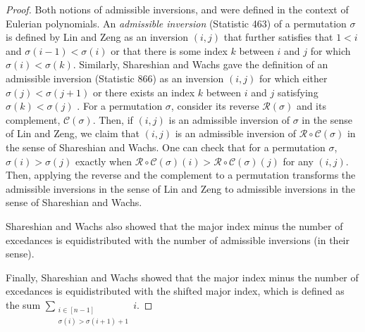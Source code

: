 \documentclass{amsart}
\theoremstyle{definition}
\newcommand{\C}{\mathcal{C}} %
\newcommand{\R}{\mathcal{R}} %
\begin{document}
\begin{proof}
  Both notions of admissible inversions, and were defined in the context of Eulerian polynomials. An \textit{admissible inversion} (Statistic 463) of a permutation $\sigma$ is defined by Lin and Zeng  \cite{LinZeng}  as an inversion $(i,j)$ that further satisfies that $1<i$ and $\sigma(i-1)<\sigma(i)$ or that there is some index $k$ between $i$ and $j$ for which $\sigma(i)<\sigma(k)$. Similarly, Shareshian and Wachs gave the definition of an admissible inversion (Statistic 866) as an inversion $(i,j)$ for which either $\sigma(j)<\sigma(j+1)$ or there exists an index $k$ between $i$ and $j$ satisfying $\sigma(k)<\sigma(j)$ \cite{ShareshianWachs2007}. For a permutation $\sigma$, consider its reverse $\R(\sigma)$ and its complement, $\C(\sigma)$. Then, if $(i,j)$ is an admissible inversion of $\sigma$ in the sense of Lin and Zeng, we claim that $(i,j)$ is an admissible inversion of $\R\circ\C(\sigma)$ in the sense of Shareshian and Wachs.
  One can check that for a permutation $\sigma$, $\sigma(i)>\sigma(j)$ exactly when $\R\circ\C(\sigma)(i)>\R\circ\C(\sigma)(j)$ for any $(i, j)$. Then, applying the reverse and the complement to a permutation transforms the admissible inversions in the sense of Lin and Zeng to admissible inversions in the sense of Shareshian and Wachs.

  Shareshian and Wachs also showed \cite[Theorem 4.1]{ShareshianWachs2007} that the major index minus the number of excedances is equidistributed with the number of admissible inversions (in their sense).

  Finally, Shareshian and Wachs showed \cite[Theorem 9.7]{ShareshianWachs2016} that the major index minus the number of excedances is equidistributed with the shifted major index, which is defined as the sum
$\displaystyle\sum_{\substack{i \in [n-1]\\ \sigma(i)>\sigma(i+1)+1}} i$.
\end{proof}
\end{document}

